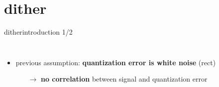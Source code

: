 \section{dither}
	\begin{frame}{dither}{introduction 1/2}
        \begin{columns}
		\begin{itemize}
			\item	previous assumption: \textbf{quantization error is white noise} (rect)
				\pause
				\begin{itemize}
					\item[$\rightarrow$]	\textbf{no correlation} between signal and quantization error
				\end{itemize}
                \smallskip
		\end{itemize}
    \end{columns}
	\end{frame}	
